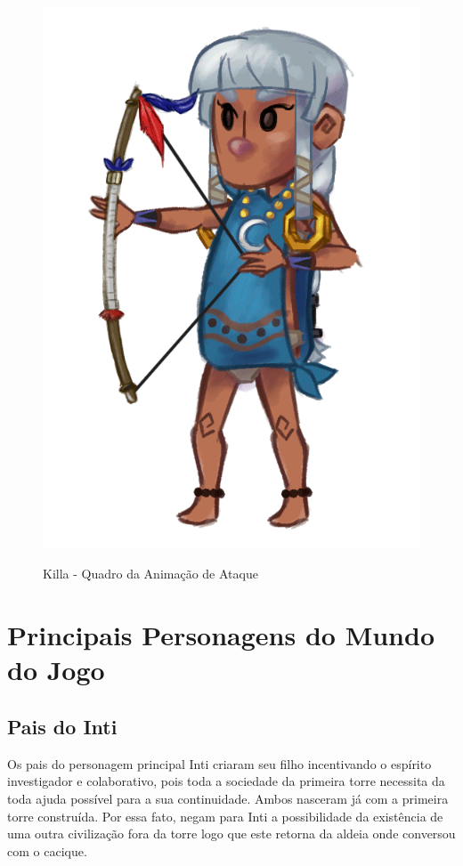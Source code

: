 \documentclass[12pt]{article}
\begin{document}
\begin{figure}[!htb]
    \centering
    \includegraphics[scale=0.2]{killa_attack.png}
    \label{fig:killa_attack}
    \caption{Killa - Quadro da Animação de Ataque}
\end{figure}

\newpage

\section{Principais Personagens do Mundo do Jogo}

\subsection{Pais do Inti}
Os pais do personagem principal Inti criaram seu filho incentivando o espírito
investigador e colaborativo, pois toda a sociedade da primeira torre necessita
da toda ajuda possível para a sua continuidade. Ambos nasceram já com a primeira
torre construída. Por essa fato, negam para Inti a possibilidade da existência
de uma outra civilização fora da torre logo que este retorna da aldeia onde
conversou com o cacique.
\end{document}
